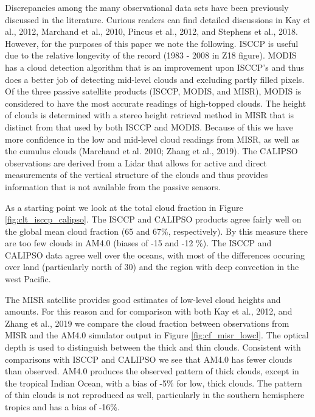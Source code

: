 \documentclass[draft]{agujournal2019}
\begin{document}
Discrepancies among the many observational data sets have been previously discussed in the literature.
Curious readers can find detailed discussions in Kay et al., 2012,
Marchand et al., 2010, Pincus et al., 2012, and Stephens et al., 2018.  However, for the 
purposes of this paper we note the following.  ISCCP is useful due to 
the relative longevity of the record (1983 - 2008 in Z18 figure). 
MODIS has a cloud detection algorithm that is an improvement upon ISCCP's and
thus does a better job of detecting mid-level clouds and excluding partly filled pixels.   
Of the three passive satellite products (ISCCP, MODIS, and MISR), MODIS is considered to have the most 
accurate readings of high-topped clouds.  The height of clouds is determined with a stereo height retrieval 
method in MISR that is distinct from that used by both ISCCP and MODIS.  Because of this we have more 
confidence in the low and mid-level cloud readings 
from MISR, as well as the cumulus clouds (Marchand et al. 2010; Zhang et al., 2019).   The CALIPSO observations
are derived from a Lidar that allows for active and direct measurements of the vertical structure of the clouds and thus 
provides information that is not available from the passive sensors.  

As a starting point we look at the total cloud fraction in Figure \ref{fig:clt_isccp_calipso}.  The ISCCP and 
CALIPSO products agree fairly well on the 
global mean cloud fraction (65 and 67\%, respectively).   By this measure there are too few clouds in AM4.0 
(biases of -15 and -12 \%).   The ISCCP and CALIPSO data agree well over the oceans, with most of the differences
occuring over land (particularly north of 30) and the region with deep convection in the west Pacific.    


The MISR satellite provides good estimates of low-level cloud heights and amounts.  
For this reason and for comparison with both Kay et al., 2012, and Zhang et al., 2019 we compare the cloud fraction 
between observations from MISR and the AM4.0 simulator output in Figure \ref{fig:cf_misr_lowcl}.  
The optical depth is used to distinguish between the thick and thin clouds.  
Consistent with comparisons with ISCCP and CALIPSO we see that AM4.0 has fewer clouds than observed.  
AM4.0 produces the observed pattern of thick clouds, except in the tropical Indian Ocean, with a 
bias of -5\% for low, thick clouds.  
The pattern of thin clouds is not reproduced as well, particularly in the southern hemisphere tropics
and has a bias of -16\%.   
\end{document}
